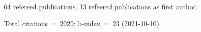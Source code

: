 64 refereed publications. 13 refeered publications as first author.

Total citations~=~2029; h-index~=~23 (2021-10-10)